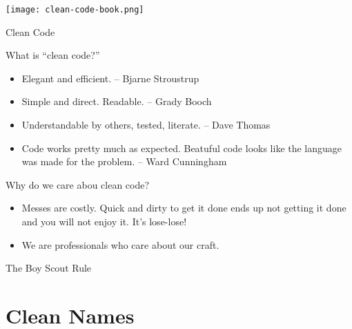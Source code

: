 \documentclass{beamer}
\author[Chris Simpkins] {}
\institute[Georgia Tech] %
\date[CS 1331]{}
\begin{document}
\begin{frame}
  \titlepage
\vspace{-1.1in}
\begin{center}
\texttt{[image: clean-code-book.png]}
\end{center}
\end{frame}

\begin{frame}[fragile]{Clean Code}


What is ``clean code?''
\begin{itemize}
\item Elegant and efficient. -- Bjarne Stroustrup
\item Simple and direct. Readable.  -- Grady Booch
\item Understandable by others, tested, literate. -- Dave Thomas
\item Code works pretty much as expected.  Beatuful code looks like the language was made for the problem. -- Ward Cunningham
\end{itemize}

Why do we care abou clean code?
\begin{itemize}
\item Messes are costly.  Quick and dirty to get it done ends up not getting it done and you will not enjoy it.  It's lose-lose!
\item We are professionals who care about our craft. 
\end{itemize}

The Boy Scout Rule

\end{frame}

\section{Clean Names}
\end{document}
